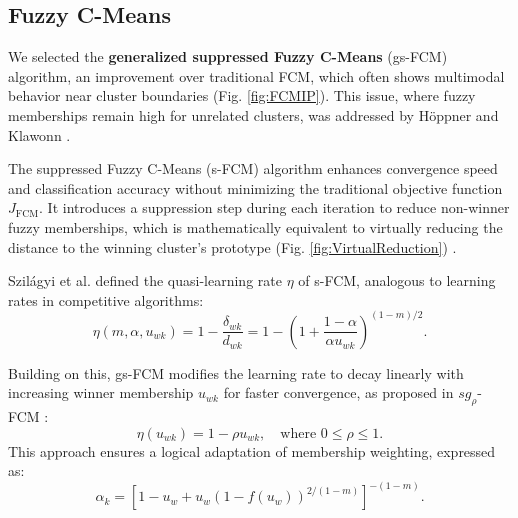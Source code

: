\subsection{Fuzzy C-Means}

We selected the \textbf{generalized suppressed Fuzzy C-Means} (gs-FCM) algorithm, an improvement over traditional FCM, which often shows multimodal behavior near cluster boundaries (Fig. \ref{fig:FCMIP}). This issue, where fuzzy memberships remain high for unrelated clusters, was addressed by Höppner and Klawonn \cite{Hoppner2003}.

The suppressed Fuzzy C-Means (s-FCM) algorithm \cite{Fan2003} enhances convergence speed and classification accuracy without minimizing the traditional objective function \( J_{\text{FCM}} \). It introduces a suppression step during each iteration to reduce non-winner fuzzy memberships, which is mathematically equivalent to virtually reducing the distance to the winning cluster's prototype (Fig. \ref{fig:VirtualReduction}) \cite{Szilagyi2010}.

Szilágyi et al. \cite{Szilagyi2010} defined the quasi-learning rate \(\eta\) of s-FCM, analogous to learning rates in competitive algorithms:
\[
\eta(m, \alpha, u_{wk}) = 1 - \frac{\delta_{wk}}{d_{wk}} = 1 - \left( 1 + \frac{1-\alpha}{\alpha u_{wk}} \right)^{(1-m)/2}.
\]

Building on this, gs-FCM modifies the learning rate to decay linearly with increasing winner membership \(u_{wk}\) for faster convergence, as proposed in $sg_\rho$-FCM \cite{Szilagyi2014}:
\[
\eta(u_{wk}) = 1 - \rho u_{wk}, \quad \text{where } 0 \leq \rho \leq 1.
\]
This approach ensures a logical adaptation of membership weighting, expressed as:
\[
\alpha_k = \left[ 1 - u_w + u_w \left( 1 - f(u_w) \right)^{2/(1-m)} \right]^{-(1-m)}.
\]

